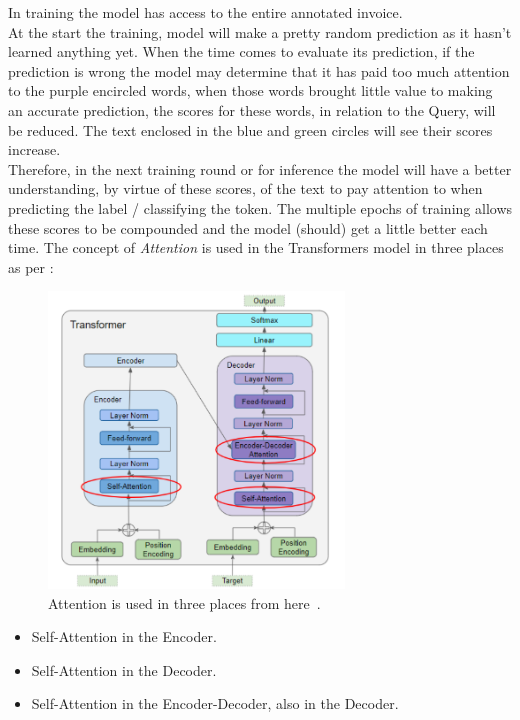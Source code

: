 In training the model has access to the entire annotated invoice.\\
At the start the training, model will make a pretty random prediction as it hasn't learned anything yet. When the time comes to evaluate its prediction,
if the prediction is wrong the model may determine that it has paid too much attention to the purple encircled words, when those words brought little value to making
an accurate prediction, the scores for these words, in relation to the Query, will be reduced. The text enclosed in the blue and green circles will
see their scores increase. \\
Therefore, in the next training round or for inference the model will have a better understanding, by virtue of these scores, of the text to pay attention
to when predicting the label / classifying the token. The multiple epochs of training allows these scores to be compounded and the model (should) get a little
better each time.
\bigbreak
The concept of \emph{Attention} is used in the Transformers model in three places as per :
\begin{figure}[H]
	\centering
	\includegraphics[width=0.7\textwidth]{figures/attention_usage.png}
	\caption[Attention Usage]{Attention is used in three places from here~\autocite{doshiTransformersExplainedVisually2021a}.}
	\label{fig:attention_usage}
\end{figure}
\begin{itemize}
	\item Self-Attention in the Encoder.
	\item Self-Attention in the Decoder.
	\item Self-Attention in the Encoder-Decoder, also in the Decoder.
\end{itemize}
